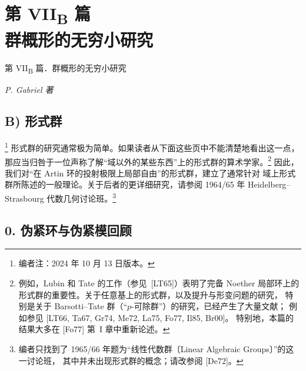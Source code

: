 
\chapter*{第 \texorpdfstring{VII\textsubscript{B}}{VII-B} 篇\\
群概形的无穷小研究}
\label{sga3:VIIB:title}
%
  {第 VII\textsubscript{B} 篇．群概形的无穷小研究}

\begin{center}
  \textit{P. Gabriel 著}
\end{center}

\setcounter{footnote}{-1}
\section*{B) 形式群}
\label{sga3:VIIB:B}

\noindent\footnote{编者注：2024 年 10 月 13 日版本。}
形式群的研究通常极为简单。如果读者从下面这些页中不能清楚地看出这一点，
那应当归咎于一位声称了解“域以外的某些东西”上的形式群的算术学家。\footnote{例如，Lubin 和 Tate 的工作（参见\ \textup{[LT65]}）表明了完备
Noether 局部环上的形式群的重要性。关于任意基上的形式群，以及提升与形变问题的研究，
特别是关于 Barsotti--Tate 群（“\(p\)-可除群”）的研究，已经产生了大量文献；
例如参见 \textup{[LT66, Ta67, Gr74, Me72, La75, Fo77, Il85, Br00]}。
特别地，本篇的结果大多在 \textup{[Fo77]} 第~I 章中重新论述。}
因此，我们对“在 Artin 环的投射极限上局部自由”的形式群，建立了通常针对
域上形式群所陈述的一般理论。关于后者的更详细研究，请参阅 1964/65 年
Heidelberg--Strasbourg 代数几何讨论班。\footnote{编者只找到了 1965/66 年题为“线性代数群〔Linear Algebraic Groups〕”的这一讨论班，
其中并未出现形式群的概念；请改参阅 \textup{[De72]}。}

\section*{0. 伪紧环与伪紧模回顾}
\label{sga3:VIIB:0}

